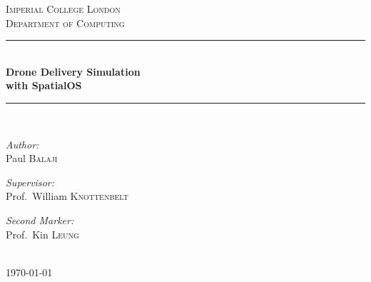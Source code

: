 \documentclass[a4paper,12pt,titlepage]{article}
\begin{document}
\begin{titlepage}

\newcommand{\HRule}{\rule{\linewidth}{0.5mm}} %
\setlength{\topmargin}{0in}
\center %



\textsc{\LARGE Imperial College London}\\[1.5cm] %
\textsc{\Large Department of Computing}\\[0.5cm] %


\HRule \\[0.4cm]
{ \huge \bfseries Drone Delivery Simulation\\with SpatialOS}\\[0.4cm] %
\HRule \\[0.4cm]


\begin{minipage}[t]{0.4\textwidth}
\begin{flushleft} \large
\emph{Author:}\\
Paul \textsc{Balaji} \\
\end{flushleft}
\end{minipage}
\begin{minipage}[t]{0.5\textwidth}
\begin{flushright} \large
\emph{Supervisor:} \\
Prof.~William \textsc{Knottenbelt}
\end{flushright}
\begin{flushright} \large
\emph{Second Marker:} \\
Prof.~Kin \textsc{Leung}
\end{flushright}
\end{minipage}\\[1cm]


{\large \today}\\[0.5cm] %


\vfill %

\end{titlepage}
\end{document}
